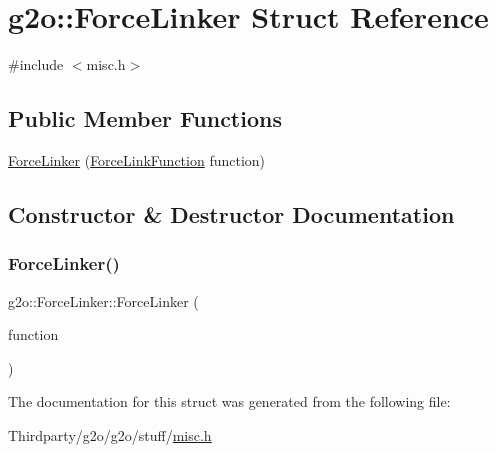 \hypertarget{structg2o_1_1_force_linker}{}\section{g2o\+:\+:Force\+Linker Struct Reference}
\label{structg2o_1_1_force_linker}


{\ttfamily \#include $<$misc.\+h$>$}

\subsection*{Public Member Functions}
\begin{DoxyCompactItemize}
\item 
\mbox{\hyperlink{structg2o_1_1_force_linker_ae5489ea8966a1d1f62471075f1dd2524}{Force\+Linker}} (\mbox{\hyperlink{namespaceg2o_a3be76fea59d320255e89425439f18f48}{Force\+Link\+Function}} function)
\end{DoxyCompactItemize}


\subsection{Constructor \& Destructor Documentation}
\mbox{\label{structg2o_1_1_force_linker_ae5489ea8966a1d1f62471075f1dd2524}} 
\subsubsection{\texorpdfstring{Force\+Linker()}{ForceLinker()}}
{\footnotesize\ttfamily g2o\+::\+Force\+Linker\+::\+Force\+Linker (\begin{DoxyParamCaption}\item[{\mbox{\hyperlink{namespaceg2o_a3be76fea59d320255e89425439f18f48}{Force\+Link\+Function}}}]{function }\end{DoxyParamCaption})\hspace{0.3cm}{\ttfamily [inline]}}



The documentation for this struct was generated from the following file\+:\begin{DoxyCompactItemize}
\item 
Thirdparty/g2o/g2o/stuff/\mbox{\hyperlink{misc_8h}{misc.\+h}}\end{DoxyCompactItemize}
